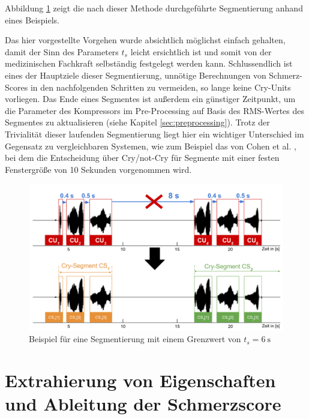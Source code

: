 Abbildung \ref{img:segmenting06} zeigt die nach dieser Methode durchgeführte Segmentierung anhand eines Beispiels.

Das hier vorgestellte Vorgehen wurde absichtlich möglichst einfach gehalten, damit der Sinn des Parameters $t_{s}$ leicht ersichtlich ist und somit von der medizinischen Fachkraft selbständig festgelegt werden kann. Schlussendlich ist eines der Hauptziele dieser Segmentierung, unnötige Berechnungen von Schmerz-Scores in den nachfolgenden Schritten zu vermeiden, so lange keine Cry-Units vorliegen. Das Ende eines Segmentes ist außerdem ein günstiger Zeitpunkt, um die Parameter des Kompressors im Pre-Processing auf Basis des RMS-Wertes des Segmentes zu aktualisieren (siehe Kapitel \ref{sec:preprocessing}). Trotz der Trivialität dieser laufenden Segmentierung liegt hier ein wichtiger Unterschied im Gegensatz zu vergleichbaren Systemen, wie zum Beispiel das von Cohen et al. \cite{cohenCry}, bei dem die Entscheidung über Cry/not-Cry für Segmente mit einer festen Fenstergröße von 10 Sekunden vorgenommen wird. 

\begin{figure}[H]
	\centering
	\includegraphics[width=1\textwidth]{bilder/segmentierung06.png}
	\caption{Beispiel für eine Segmentierung mit einem Grenzwert von $t_s = \SI{6}{\second}$}
	\label{img:segmenting06}
\end{figure}

\section{Extrahierung von Eigenschaften und Ableitung der Schmerzscore}
\label{sec:overviewPainRegression}

